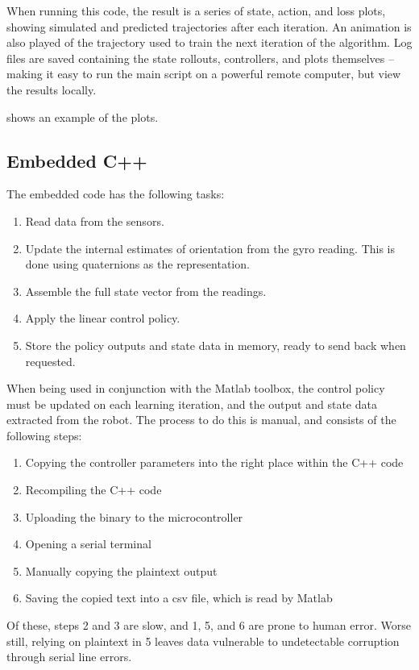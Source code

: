 \documentclass[main.tex]{subfiles}
\begin{document}
	When running this code, the result is a series of state, action, and loss plots, showing simulated and predicted trajectories after each iteration.
	An animation is also played of the trajectory used to train the next iteration of the algorithm.
	Log files are saved containing the state rollouts, controllers, and plots themselves -- making it easy to run the main script on a powerful remote computer, but view the results locally.

	 shows an example of the plots.

	\subsection{Embedded C++}

	The embedded code has the following tasks:
	\begin{enumerate}[noitemsep]
		\item Read data from the sensors.
		\item
			Update the internal estimates of orientation from the gyro reading.
			This is done using quaternions as the representation.
		\item Assemble the full state vector from the readings.
		\item Apply the linear control policy.
		\item Store the policy outputs and state data in memory, ready to send back when requested.
	\end{enumerate}
	When being used in conjunction with the Matlab toolbox, the control policy must be updated on each learning iteration, and the output and state data extracted from the robot.
	The process to do this is manual, and consists of the following steps:
	\begin{enumerate}[noitemsep]
		\item Copying the controller parameters into the right place within the C++ code
		\item Recompiling the C++ code
		\item Uploading the binary to the microcontroller
		\item Opening a serial terminal
		\item Manually copying the plaintext output
		\item Saving the copied text into a csv file, which is read by Matlab
	\end{enumerate}
	Of these, steps 2 and 3 are slow, and 1, 5, and 6 are prone to human error.
	Worse still, relying on plaintext in 5 leaves data vulnerable to undetectable corruption through serial line errors\footnotemark.
\end{document}
